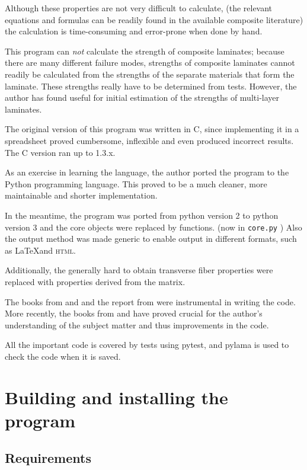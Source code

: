 \documentclass[a4paper,landscape,oneside,11pt,twocolumn]{memoir}
\begin{document}
Although these properties are not very difficult to calculate, (the relevant
equations and formulas can be readily found in the available composite
literature) the calculation is time-consuming and error-prone when done by
hand.

This program can \emph{not} calculate the strength of composite laminates;
because there are many different failure modes, strengths of composite
laminates cannot readily be calculated from the strengths of the separate
materials that form the laminate. These strengths really have to be determined from
tests. However, the author has found \citet{1992WeiEn..52...29H} useful for
initial estimation of the strengths of multi-layer laminates.

The original version of this program was written in C, since implementing
it in a spreadsheet proved cumbersome, inflexible and even produced
incorrect results. The C version ran up to 1.3.x.

As an exercise in learning the language, the author ported the program to
the Python programming language. This proved to be a much cleaner, more
maintainable and shorter implementation.

In the meantime, the program was ported from python version 2 to python
version 3 and the core objects were replaced by functions. (now in
\texttt{core.py} ) Also the output method was made generic to enable output in
different formats, such as \LaTeX and \textsc{html}.

Additionally, the generally hard to obtain transverse fiber properties
were replaced with properties derived from the matrix.

The books from \citet{Hyer:1998} and \citet{Tsai:1992} and the report from
\citet{Nettles:1994} were instrumental in writing the code.
More recently, the books from \citet{Bower:2010} and
\citet{Barbero:2008,Barbero:2018} have proved crucial for the
author's understanding of the subject matter and thus improvements in the
code.

All the important code is covered by tests using pytest, and pylama is used to
check the code when it is saved.

\chapter{Building and installing the program} %

\section{Requirements} %
\end{document}
